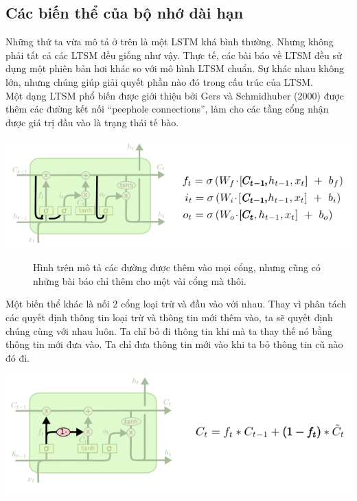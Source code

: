 \subsection{Các biến thể của bộ nhớ dài hạn}
Những thứ ta vừa mô tả ở trên là một LSTM khá bình thường. Nhưng không phải tất cả các LTSM đều giống như vậy. Thực tế, các bài báo về LTSM đều sử dụng một phiên bản hơi khác so với mô hình LTSM chuẩn. Sự khác nhau không lớn, nhưng chúng giúp giải quyết phần nào đó trong cấu trúc của LTSM.\\
Một dạng LTSM phổ biến được giới thiệu bởi Gers và Schmidhuber (2000) được thêm các đường kết nối “peephole connections”, làm cho các tầng cổng nhận được giá trị đầu vào là trạng thái tế bào.
\begin{center}
    \includegraphics[scale=.5]{image/chapter6/bth1.png}
    \begin{figure}[htp]
    \begin{center}
     
    \end{center}
    \caption{Hình trên mô tả các đường được thêm vào mọi cổng, nhưng cũng có những bài báo chỉ thêm cho một vài cổng mà thôi.}
    \end{figure}
\end{center}
Một biến thể khác là nối 2 cổng loại trừ và đầu vào với nhau. Thay vì phân tách các quyết định thông tin loại trừ và thông tin mới thêm vào, ta sẽ quyết định chúng cùng với nhau luôn. Ta chỉ bỏ đi thông tin khi mà ta thay thế nó bằng thông tin mới đưa vào. Ta chỉ đưa thông tin mới vào khi ta bỏ thông tin cũ nào đó đi.
\begin{center}
    \includegraphics[scale=.5]{image/chapter6/bth2.png}
    \begin{figure}[htp]
    \begin{center}
     
    \end{center}
    \end{figure}
\end{center}
